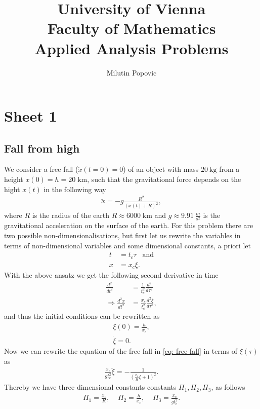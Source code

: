 \documentclass[a4paper]{article}
\title{University of Vienna\\ Faculty of Mathematics\\
\vspace{1cm}Applied Analysis Problems
}
\author{Milutin Popovic}
\begin{document}
\maketitle
\tableofcontents

\section{Sheet 1}

\subsection{Fall from high}
We consider a free fall ($\dot{x}(t=0)=0$) of an object with mass $20\
\text{kg}$ from a height
$x(0) = h = 20\; \text{km}$, such that the gravitational force depends on the hight $x(t)$ in
the following way
\begin{align}\label{eq: free fall}
    \ddot{x} = -g\frac{R^2}{(x(t) + R)^2},
\end{align}
where $R$ is the radius of the earth $R \approx 6000\; \text{km}$ and $g
\approx 9.91\ \frac{m}{s^2}$ is the gravitational acceleration on the surface
of the earth. For this problem there are two possible non-dimensionalisations,
but first let us rewrite the variables in terms of non-dimensional variables
and some dimensional constants, a priori let
\begin{align}
    t &= t_c \tau \;\;\; \text{and}\\
    x &= x_c \xi.
\end{align}
With the above ansatz we get the following second derivative in
time
\begin{align}
        \frac{d^2}{dt^2} &= \frac{1}{t_c^2}\frac{d^2}{d\tau^2} \\
        \Rightarrow \frac{d^2x}{dt^2} &= \frac{x_c}{t_c^2}
        \frac{d^2\xi}{d\tau^2},
\end{align}
and thus the initial conditions can be rewritten as
\begin{align}
    \xi(0) = \frac{h}{x_c},\\
    \dot{\xi} = 0.
\end{align}
Now we can rewrite the equation of the free fall in \ref{eq: free fall} in
terms of $\xi(\tau)$ as
\begin{align}
   \frac{x_c}{gt_c^2} \ddot{\xi} = -\frac{1}{(\frac{x_c}{R}\xi +1)^2}.
\end{align}
Thereby we have three dimensional constants constants $\Pi_1, \Pi_2, \Pi_3$,
as follows
\begin{align}
    \Pi_1 = \frac{x_c}{R}, \;\;\;\; \Pi_2 = \frac{h}{x_c}, \;\;\;\;
    \Pi_3 = \frac{x_c}{gt_c^2}.
\end{align}
\end{document}

